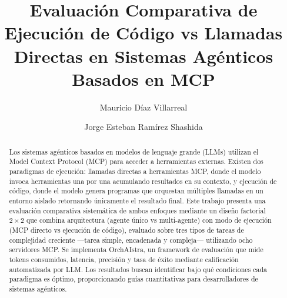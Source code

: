 \documentclass[runningheads]{llncs}
\begin{document}
%
\title{Evaluaci\'on Comparativa de Ejecuci\'on de C\'odigo vs Llamadas Directas en Sistemas Ag\'enticos Basados en MCP}
%
%
\author{Mauricio D\'iaz Villarreal \and
Jorge Esteban Ram\'irez Shashida}
%
%
%
\maketitle
%
\begin{abstract}
Los sistemas ag\'enticos basados en modelos de lenguaje grande (LLMs) utilizan
el Model Context Protocol (MCP) para acceder a herramientas externas. Existen
dos paradigmas de ejecuci\'on: llamadas directas a herramientas MCP, donde el
modelo invoca herramientas una por una acumulando resultados en su contexto, y
ejecuci\'on de c\'odigo, donde el modelo genera programas que orquestan m\'ultiples
llamadas en un entorno aislado retornando \'unicamente el resultado final.
Este trabajo presenta una evaluaci\'on comparativa sistem\'atica de ambos enfoques
mediante un dise\~no factorial $2 \times 2$ que combina arquitectura (agente
\'unico vs multi-agente) con modo de ejecuci\'on (MCP directo vs ejecuci\'on de
c\'odigo), evaluado sobre tres tipos de tareas de complejidad creciente ---tarea
simple, encadenada y compleja--- utilizando ocho servidores MCP. Se implementa
OrchAIstra, un framework de evaluaci\'on que mide tokens consumidos, latencia,
precisi\'on y tasa de \'exito mediante calificaci\'on automatizada por LLM.
Los resultados buscan identificar bajo qu\'e condiciones cada paradigma es
\'optimo, proporcionando gu\'ias cuantitativas para desarrolladores de sistemas
ag\'enticos.

\end{abstract}
%
\end{document}
